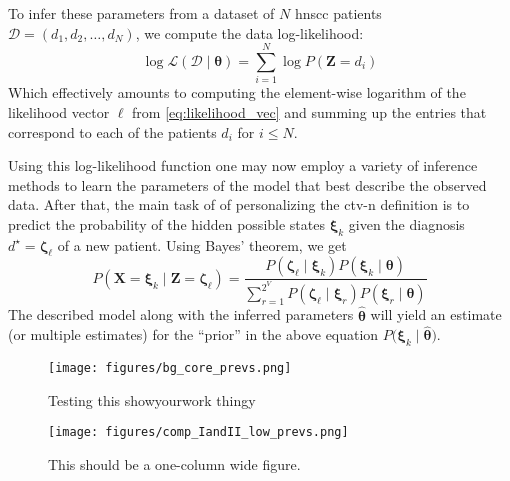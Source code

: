 \documentclass[twocolumn]{aastex631}
\begin{document}
To infer these parameters from a dataset of $N$ \gls{hnscc} patients $\boldsymbol{\mathcal{D}} = \left( d_1, d_2, \ldots, d_N \right)$, we compute the data log-likelihood:
%
\begin{equation}
    \log\mathcal{L} \left( \boldsymbol{\mathcal{D}} \mid \boldsymbol{\theta} \right) = \sum_{i=1}^N \log P \left( \mathbf{Z} = d_i \right)
\end{equation}
%
Which effectively amounts to computing the element-wise logarithm of the likelihood vector $\boldsymbol{\ell}$ from \cref{eq:likelihood_vec} and summing up the entries that correspond to each of the patients $d_i$ for $i\leq N$. 

Using this log-likelihood function one may now employ a variety of inference methods to learn the parameters of the model that best describe the observed data. After that, the main task of of personalizing the \gls{ctv-n} definition is to predict the probability of the hidden possible states $\boldsymbol{\xi}_k$ given the diagnosis $d^\star=\boldsymbol{\zeta}_\ell$ of a new patient. Using Bayes' theorem, we get
%
\begin{equation}
    P\left( \mathbf{X}=\boldsymbol{\xi}_k \mid \mathbf{Z}=\boldsymbol{\zeta}_\ell \right) = \frac{P\left( \boldsymbol{\zeta}_\ell \mid \boldsymbol{\xi}_k \right) P\left( \boldsymbol{\xi}_k \mid \boldsymbol{\theta} \right)}{\sum_{r=1}^{2^V} P\left( \boldsymbol{\zeta}_\ell \mid \boldsymbol{\xi}_r \right) P\left( \boldsymbol{\xi}_r \mid \boldsymbol{\theta} \right) }
\end{equation}
%
The described model along with the inferred parameters $\boldsymbol{\hat{\theta}}$ will yield an estimate (or multiple estimates) for the ``prior'' in the above equation $P\big( \boldsymbol{\xi}_k \mid \boldsymbol{\hat{\theta}} \big)$.

\begin{figure*}
    \begin{centering}
        \texttt{[image: figures/bg\_core\_prevs.png]}
        \caption{Testing this showyourwork thingy}
        \label{fig:bg_prevalences}
    \end{centering}
\end{figure*}

\begin{figure}
    \begin{centering}
        \texttt{[image: figures/comp\_IandII\_low\_prevs.png]}
        \caption{This should be a one-column wide figure.}
        \label{fig:IandII_low_prevs}
    \end{centering}
\end{figure}
\end{document}
